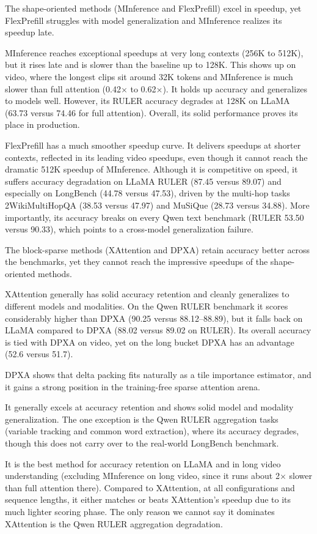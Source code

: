 The shape-oriented methods (MInference and FlexPrefill) excel in speedup, yet FlexPrefill struggles with model generalization and MInference realizes its speedup late.

MInference reaches exceptional speedups at very long contexts (256K to 512K), but it rises late and is slower than the baseline up to 128K. This shows up on video, where the longest clips sit around 32K tokens and MInference is much slower than full attention (0.42$\times$ to 0.62$\times$). It holds up accuracy and generalizes to models well. However, its RULER accuracy degrades at 128K on LLaMA (63.73 versus 74.46 for full attention). Overall, its solid performance proves its place in production.

FlexPrefill has a much smoother speedup curve. It delivers speedups at shorter contexts, reflected in its leading video speedups, even though it cannot reach the dramatic 512K speedup of MInference. Although it is competitive on speed, it suffers accuracy degradation on LLaMA RULER (87.45 versus 89.07) and especially on LongBench (44.78 versus 47.53), driven by the multi-hop tasks 2WikiMultiHopQA (38.53 versus 47.97) and MuSiQue (28.73 versus 34.88). More importantly, its accuracy breaks on every Qwen text benchmark (RULER 53.50 versus 90.33), which points to a cross-model generalization failure.

The block-sparse methods (XAttention and DPXA) retain accuracy better across the benchmarks, yet they cannot reach the impressive speedups of the shape-oriented methods.

XAttention generally has solid accuracy retention and cleanly generalizes to different models and modalities. On the Qwen RULER benchmark it scores considerably higher than DPXA (90.25 versus 88.12--88.89), but it falls back on LLaMA compared to DPXA (88.02 versus 89.02 on RULER). Its overall accuracy is tied with DPXA on video, yet on the long bucket DPXA has an advantage (52.6 versus 51.7).

DPXA shows that delta packing fits naturally as a tile importance estimator, and it gains a strong position in the training-free sparse attention arena.

It generally excels at accuracy retention and shows solid model and modality generalization. The one exception is the Qwen RULER aggregation tasks (variable tracking and common word extraction), where its accuracy degrades, though this does not carry over to the real-world LongBench benchmark.

It is the best method for accuracy retention on LLaMA and in long video understanding (excluding MInference on long video, since it runs about 2$\times$ slower than full attention there). Compared to XAttention, at all configurations and sequence lengths, it either matches or beats XAttention's speedup due to its much lighter scoring phase. The only reason we cannot say it dominates XAttention is the Qwen RULER aggregation degradation.

